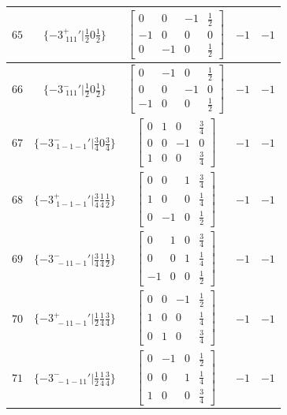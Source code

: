 \documentclass[fleqn,8pt]{jsarticle}
\begin{document}
\begin{longtable}{ccccc}
$ 65 $ & $ \{-3^{+}_{\,\,111}{}'|\frac{1}{2} 0 \frac{1}{2}\} $ & $ \begin{bmatrix} 0 & 0 & -1 & \frac{1}{2} \\ -1 & 0 & 0 & 0 \\ 0 & -1 & 0 & \frac{1}{2} \end{bmatrix} $ & $ -1 $ & $ -1 $ \\ \hline
$ 66 $ & $ \{-3^{-}_{\,\,111}{}'|\frac{1}{2} 0 \frac{1}{2}\} $ & $ \begin{bmatrix} 0 & -1 & 0 & \frac{1}{2} \\ 0 & 0 & -1 & 0 \\ -1 & 0 & 0 & \frac{1}{2} \end{bmatrix} $ & $ -1 $ & $ -1 $ \\ \hline
$ 67 $ & $ \{-3^{-}_{\,\,1-1-1}{}'|\frac{3}{4} 0 \frac{3}{4}\} $ & $ \begin{bmatrix} 0 & 1 & 0 & \frac{3}{4} \\ 0 & 0 & -1 & 0 \\ 1 & 0 & 0 & \frac{3}{4} \end{bmatrix} $ & $ -1 $ & $ -1 $ \\ \hline
$ 68 $ & $ \{-3^{+}_{\,\,1-1-1}{}'|\frac{3}{4} \frac{1}{4} \frac{1}{2}\} $ & $ \begin{bmatrix} 0 & 0 & 1 & \frac{3}{4} \\ 1 & 0 & 0 & \frac{1}{4} \\ 0 & -1 & 0 & \frac{1}{2} \end{bmatrix} $ & $ -1 $ & $ -1 $ \\ \hline
$ 69 $ & $ \{-3^{-}_{\,\,-11-1}{}'|\frac{3}{4} \frac{1}{4} \frac{1}{2}\} $ & $ \begin{bmatrix} 0 & 1 & 0 & \frac{3}{4} \\ 0 & 0 & 1 & \frac{1}{4} \\ -1 & 0 & 0 & \frac{1}{2} \end{bmatrix} $ & $ -1 $ & $ -1 $ \\ \hline
$ 70 $ & $ \{-3^{+}_{\,\,-11-1}{}'|\frac{1}{2} \frac{1}{4} \frac{3}{4}\} $ & $ \begin{bmatrix} 0 & 0 & -1 & \frac{1}{2} \\ 1 & 0 & 0 & \frac{1}{4} \\ 0 & 1 & 0 & \frac{3}{4} \end{bmatrix} $ & $ -1 $ & $ -1 $ \\ \hline
$ 71 $ & $ \{-3^{-}_{\,\,-1-11}{}'|\frac{1}{2} \frac{1}{4} \frac{3}{4}\} $ & $ \begin{bmatrix} 0 & -1 & 0 & \frac{1}{2} \\ 0 & 0 & 1 & \frac{1}{4} \\ 1 & 0 & 0 & \frac{3}{4} \end{bmatrix} $ & $ -1 $ & $ -1 $ \\ \hline

\end{longtable}
\end{document}
